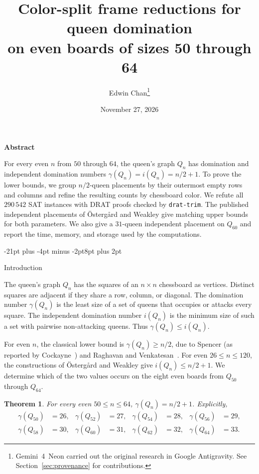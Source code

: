 \documentclass[11pt,a4paper]{article}
\title{Color-split frame reductions for queen domination\\
  on even boards of sizes 50 through 64}
\author{Edwin Chan\thanks{Gemini~4~Neon carried out the original research in Google Antigravity. See Section~\ref{sec:provenance} for contributions.}}
\date{November 27, 2026}
\makeatletter
\renewcommand{\section}{\@startsection{section}{1}{\z@}%
  {-21pt plus -4pt minus -2pt}{8pt plus 2pt}%
  {\normalfont\fontsize{14}{17}\selectfont\bfseries\raggedright}}
\renewenvironment{abstract}{%
  \par\noindent\textbf{Abstract}\par\nobreak\vskip3pt
  \noindent\ignorespaces
}{\par}
\theoremstyle{result}
\newtheorem{theorem}{Theorem}[section]
\theoremstyle{definition}
\theoremstyle{remark}
\makeatother
\begin{document}
\maketitle

\begin{abstract}
For every even $n$ from $50$ through $64$, the queen's graph $Q_n$ has
domination and independent domination numbers
$\gamma(Q_n)=i(Q_n)=n/2+1$. To prove the lower bounds, we group
$n/2$-queen placements by their outermost empty rows and columns and
refine the resulting counts by chessboard color. We refute all
$290\,542$ SAT instances with DRAT proofs checked by \texttt{drat-trim}.
The published independent placements of \"Osterg\aa rd and Weakley
give matching upper bounds for both parameters. We also give a
$31$-queen independent placement on $Q_{60}$ and report the time,
memory, and storage used by the computations.
\end{abstract}

\section{Introduction}\label{sec:intro}

The queen's graph $Q_n$ has the squares of an $n\times n$ chessboard as
vertices. Distinct squares are adjacent if they share a row, column, or
diagonal. The domination number $\gamma(Q_n)$ is the least size of a
set of queens that occupies or attacks every square. The independent
domination number $i(Q_n)$ is the minimum size of such a set with
pairwise non-attacking queens. Thus $\gamma(Q_n)\le i(Q_n)$.

For even $n$, the classical lower bound is $\gamma(Q_n)\ge n/2$,
due to Spencer (as reported by Cockayne~\cite{Cockayne1990}) and
Raghavan and Venkatesan~\cite{RV1987}. For even $26\le n\le120$,
the constructions of \"Osterg\aa rd and Weakley
\cite[Section~5]{OW2001} give $i(Q_n)\le n/2+1$.
We determine which of the two values occurs on the eight even
boards from $Q_{50}$ through $Q_{64}$.

\begin{theorem}\label{thm:main}
For every even $50\le n\le64$, $\gamma(Q_n)=n/2+1$. Explicitly,
\[
  \begin{aligned}
    \gamma(Q_{50})&=26, & \gamma(Q_{52})&=27, & \gamma(Q_{54})&=28, & \gamma(Q_{56})&=29,\\
    \gamma(Q_{58})&=30, & \gamma(Q_{60})&=31, & \gamma(Q_{62})&=32, & \gamma(Q_{64})&=33.
  \end{aligned}
\]
\end{theorem}
\end{document}
